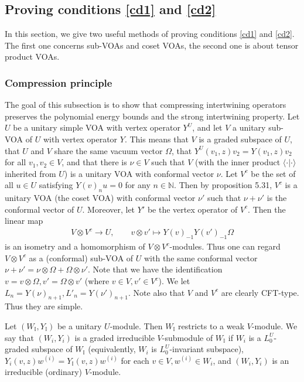 \documentclass[11pt,b5paper,notitlepage]{article}
\theoremstyle{definition}
\theoremstyle{plain}
\newcommand{\bk}[1]{\langle {#1}\rangle}
\newcommand{\mbb}{\mathbb}
\numberwithin{equation}{subsection}
\begin{document}
\subsection{Proving conditions \ref{cd1} and \ref{cd2}}

In this section, we give two useful methods of proving conditions \ref{cd1} and \ref{cd2}. The first one concerns sub-VOAs and coset VOAs, the second one is about tensor product VOAs.


\subsubsection*{Compression principle}



The goal of this subsection is to show that compressing intertwining operators preserves the polynomial energy bounds and the strong intertwining property. Let $U$ be a unitary simple VOA with vertex operator $Y^U$, and let $V$ a unitary sub-VOA of $U$ with vertex operator $Y$. This means that $V$ is a graded subspace of $U$, that $U$ and $V$ share the same vacuum vector $\Omega$, that $Y^U(v_1,z)v_2=Y(v_1,z)v_2$ for all $v_1,v_2\in V$, and that there is $\nu\in V$ such that $V$ (with the inner product $\bk {\cdot|\cdot}$ inherited from $U$) is a unitary VOA with conformal vector $\nu$. Let $V^c$ be the set of all $u\in U$ satisfying $Y(v)_nu=0$ for any $n\in\mbb N$. Then by \cite{CKLW18} proposition 5.31, $V^c$ is a unitary VOA (the coset VOA) with conformal vector $\nu'$ such that $\nu+\nu'$ is the conformal vector of $U$. Moreover, let $Y'$ be the vertex operator of $V^c$. Then the linear map
\begin{align*}
V\otimes V^c\rightarrow U,\qquad v\otimes v'\mapsto Y(v)_{-1}Y(v')_{-1}\Omega
\end{align*}
is an isometry and a homomorphism of $V\otimes V^c$-modules. Thus one can regard $V\otimes V^c$ as a (conformal) sub-VOA of $U$ with the same conformal vector $\nu+\nu'=\nu\otimes\Omega+\Omega\otimes\nu'$. Note that we have the identification $v=v\otimes\Omega,v'=\Omega\otimes v'$ (where $v\in V,v'\in V^c$). We let $L_n=Y(\nu)_{n+1},L'_n=Y(\nu')_{n+1}$. Note also that $V$ and $V^c$ are clearly CFT-type. Thus they are simple.

Let $(W_{\mbb I},Y_{\mbb I})$ be a unitary $U$-module. Then $W_{\mbb I}$ restricts to a weak $V$-module. We say that $(W_i,Y_i)$  is  a graded irreducible $V$-submodule of $W_{\mbb I}$ if $W_i$ is a $L_0^U$-graded subspace of $W_{\mbb I}$ (equivalently, $W_i$ is $L_0^U$-invariant subspace),  $Y_i(v,z)w^{(i)}=Y_{\mbb I}(v,z)w^{(i)}$ for each $v\in V,w^{(i)}\in W_i$, and $(W_i, Y_i)$ is an irreducible (ordinary) $V$-module.
\end{document}
